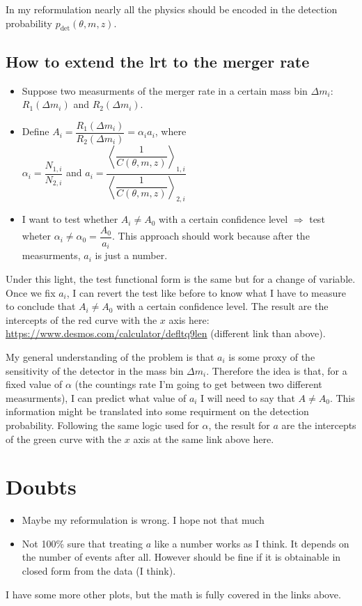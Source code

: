\documentclass[12pt,a4paper]{article}
\begin{document}
In my reformulation nearly all the physics should be encoded in the detection probability \(p_\text{det}(\theta, m, z)\).

\subsection{How to extend the \acrshort{lrt} to the merger rate}

\begin{itemize}
    \item Suppose two measurments of the merger rate in a certain mass bin $\Delta m_i$: $R_1(\Delta m_i)$ and $R_2(\Delta m_i)$.
    \item Define $A_i = \dfrac{R_1(\Delta m_i)}{R_2(\Delta m_i)} = \alpha_i a_i$, where\\
    $\alpha_i = \dfrac{N_{1, i}}{N_{2, i}}$ and $a_i = \dfrac{\left\langle \dfrac{1}{C(\theta, m, z)} \right\rangle_{1, i}}{\left\langle \dfrac{1}{C(\theta, m, z)} \right\rangle_{2, i}}$
    \item I want to test whether $A_i \neq A_0$ with a certain confidence level $\Longrightarrow$ test wheter $\alpha_i \neq \alpha_0 = \dfrac{A_0}{a_i}$. This approach should work because after the measurments, $a_i$ is just a number.
\end{itemize}

Under this light, the test functional form is the same but for a change of variable. Once we fix \(a_i\), I can revert the test like before to know what I have to measure to conclude that \(A_i \neq A_0\) with a certain confidence level. The result are the intercepts of the red curve with the \(x\) axis here: \url{https://www.desmos.com/calculator/defltq9len} (different link than above).

My general understanding of the problem is that \(a_i\) is some proxy of the sensitivity of the detector in the mass bin \(\Delta m_i\). Therefore the idea is that, for a fixed value of \(\alpha\) (the countings rate I'm going to get between two different measurments), I can predict what value of \(a_i\) I will need to say that \(A \neq A_0\). This information might be translated into some requirment on the detection probability. Following the same logic used for \(\alpha\), the result for \(a\) are the intercepts of the green curve with the \(x\) axis at the same link above here.

\section{Doubts}

\begin{itemize}
    \item Maybe my reformulation is wrong. I hope not that much
    \item Not 100\% sure that treating \(a\) like a number works as I think. It depends on the number of events after all. However should be fine if it is obtainable in closed form from the data (I think).
\end{itemize}

I have some more other plots, but the math is fully covered in the links above.
\end{document}
